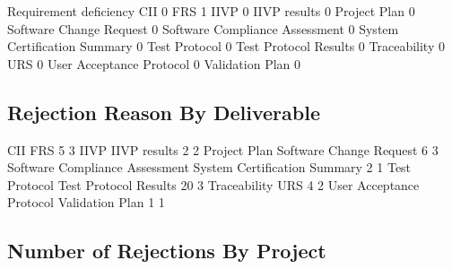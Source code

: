\documentclass{article}
\begin{document}
\begin{Schunk}
\begin{Soutput}
                                 Requirement deficiency
  CII                                                 0
  FRS                                                 1
  IIVP                                                0
  IIVP results                                        0
  Project Plan                                        0
  Software Change Request                             0
  Software Compliance Assessment                      0
  System Certification Summary                        0
  Test Protocol                                       0
  Test Protocol Results                               0
  Traceability                                        0
  URS                                                 0
  User Acceptance Protocol                            0
  Validation Plan                                     0
\end{Soutput}
\end{Schunk}


\subsection{Rejection Reason By Deliverable}

\begin{Schunk}
\begin{Soutput}
                           CII                            FRS 
                             5                              3 
                          IIVP                   IIVP results 
                             2                              2 
                  Project Plan        Software Change Request 
                             6                              3 
Software Compliance Assessment   System Certification Summary 
                             2                              1 
                 Test Protocol          Test Protocol Results 
                            20                              3 
                  Traceability                            URS 
                             4                              2 
      User Acceptance Protocol                Validation Plan 
                             1                              1 
\end{Soutput}
\end{Schunk}

\subsection{Number of Rejections By Project}
\end{document}
